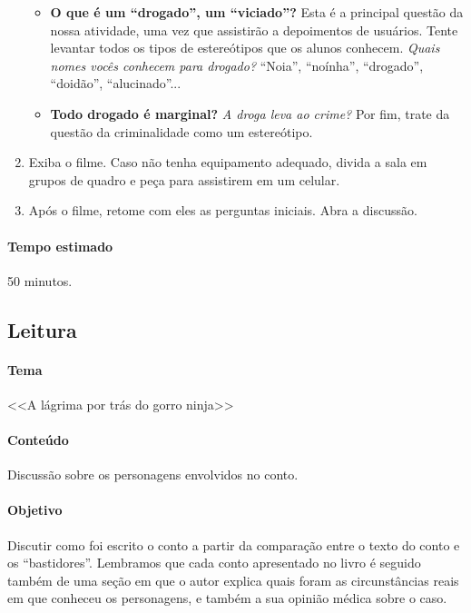 \documentclass[12pt]{extarticle}
\begin{document}
\begin{enumerate}
\begin{itemize}
			\item \textbf{O que é um ``drogado'', um ``viciado''?} Esta é a principal 
			questão da nossa atividade, uma vez que assistirão a depoimentos de 
			usuários. Tente levantar todos os tipos de estereótipos 
			que os alunos conhecem. \textit{Quais nomes vocês conhecem para drogado?}
			``Noia'', ``noínha'', ``drogado'', ``doidão'', ``alucinado''...
			
			\item \textbf{Todo drogado é marginal?} \textit{A droga leva ao crime?} Por fim, trate da
			questão da criminalidade como um estereótipo. 

		\end{itemize}

		\item Exiba o filme. Caso não tenha equipamento adequado, divida a sala em grupos de quadro
		e peça para assistirem em um celular. 
		
		\item Após o filme, retome com eles as perguntas iniciais. Abra a discussão. 
		
    \end{enumerate}

	\paragraph{Tempo estimado} 50 minutos. 




\subsection{Leitura} 

\paragraph{Tema} <<A lágrima por trás do gorro ninja>>

\paragraph{Conteúdo} Discussão sobre os personagens envolvidos no conto. 

\paragraph{Objetivo} Discutir como foi escrito o conto a partir da comparação entre 
o texto do conto e os ``bastidores''. Lembramos que cada conto apresentado no 
livro é seguido também de uma seção em que o autor explica quais foram as 
circunstâncias reais em que conheceu os personagens, e também a sua opinião médica
sobre o caso. 
\end{document}
